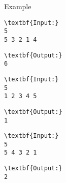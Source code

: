 Example
\begin{verbatim}
\textbf{Input:}
5
5 3 2 1 4\end{verbatim}
\begin{verbatim}
\textbf{Output:}
6\end{verbatim}
\begin{verbatim}
\textbf{Input:}
5
1 2 3 4 5\end{verbatim}
\begin{verbatim}
\textbf{Output:}
1\end{verbatim}
\begin{verbatim}
\textbf{Input:}
5
5 4 3 2 1\end{verbatim}
\begin{verbatim}
\textbf{Output:}
2\end{verbatim}